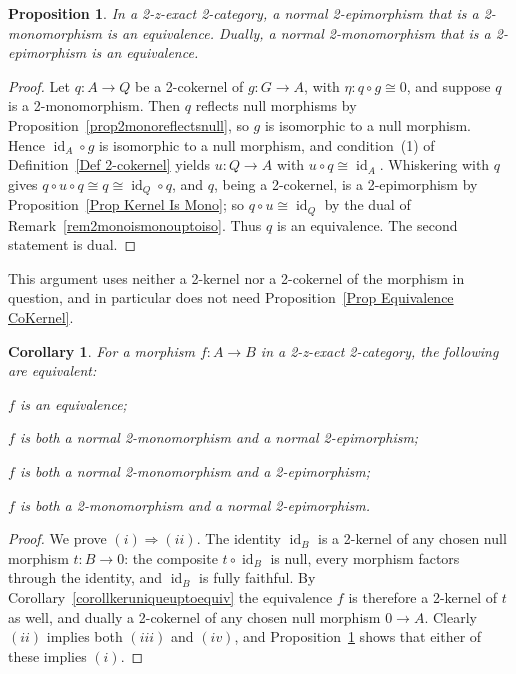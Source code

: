 \documentclass[reqno,a4paper]{amsart}
\numberwithin{equation}{section}
\theoremstyle{plain}
\newtheorem{proposition}[subsection]{Proposition}
\newtheorem{corollary}[subsection]{Corollary}
\theoremstyle{definition}
\def\nameit#1{\textrm{#1}~}
\def\prox{\nameit{Proposition}}
\def\corx{\nameit{Corollary}}
\def\defx{\nameit{Definition}}
\def\remx{\nameit{Remark}}
\newcommand{\comp}{\circ}
\newcommand{\iso}{\cong}
\renewcommand{\1}{\onecat{1}}
\newcommand{\id}[1]{\operatorname{id}_{#1}}
\begin{document}
\begin{proposition}\label{Normal Epi Mono Equivalence}
	In a 2-z-exact 2-category, a normal 2-epimorphism that is a 2-monomorphism is an equivalence. Dually, a normal 2-monomorphism that is a 2-epimorphism is an equivalence.
\end{proposition}
\begin{proof}
	Let \(q\colon A\to Q\) be a 2-cokernel of \(g\colon G\to A\), with \(\eta\colon q\comp g\iso 0\), and suppose \(q\) is a 2-monomorphism. Then \(q\) reflects null morphisms by \prox\ref{prop2monoreflectsnull}, so \(g\) is isomorphic to a null morphism. Hence \(\id{A}\comp g\) is isomorphic to a null morphism, and condition~(1) of \defx\ref{Def 2-cokernel} yields \(u\colon Q\to A\) with \(u\comp q\iso\id{A}\). Whiskering with \(q\) gives \(q\comp u\comp q\iso q\iso\id{Q}\comp q\), and \(q\), being a 2-cokernel, is a 2-epimorphism by \prox\ref{Prop Kernel Is Mono}; so \(q\comp u\iso\id{Q}\) by the dual of \remx\ref{rem2monoismonouptoiso}. Thus \(q\) is an equivalence. The second statement is dual.
\end{proof}

This argument uses neither a 2-kernel nor a 2-cokernel of the morphism in question, and in particular does not need \prox\ref{Prop Equivalence CoKernel}.

\begin{corollary}\label{Equivalence Is Mono Plus Normal Epi}
	For a morphism \(f\colon A\to B\) in a 2-z-exact 2-category, the following are equivalent:
	\begin{tfae}
		\item \(f\) is an equivalence;
		\item \(f\) is both a normal 2-monomorphism and a normal 2-epimorphism;
		\item \(f\) is both a normal 2-monomorphism and a 2-epimorphism;
		\item \(f\) is both a 2-monomorphism and a normal 2-epimorphism.
	\end{tfae}
\end{corollary}
\begin{proof}
	We prove \((i)\Rightarrow(ii)\). The identity \(\id{B}\) is a 2-kernel of any chosen null morphism \(t\colon B\to 0\): the composite \(t\comp\id{B}\) is null, every morphism factors through the identity, and \(\id{B}\) is fully faithful. By \corx\ref{corollkeruniqueuptoequiv} the equivalence \(f\) is therefore a 2-kernel of \(t\) as well, and dually a 2-cokernel of any chosen null morphism \(0\to A\). Clearly \((ii)\) implies both \((iii)\) and \((iv)\), and \prox\ref{Normal Epi Mono Equivalence} shows that either of these implies \((i)\).
\end{proof}
\end{document}
